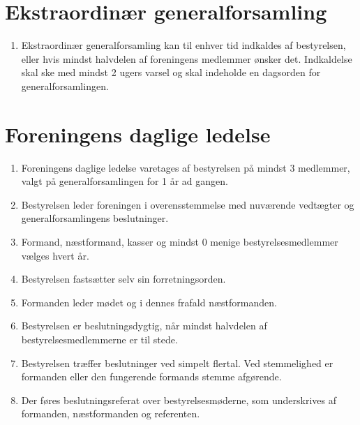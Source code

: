 \documentclass[a4paper, 10pt]{article}
\renewcommand\thesection{\textsection\arabic{section}}
\newenvironment{stykenum}{
  \begin{enumerate}[%
    label=Stk.~\arabic*:, ref=\thesection~Stk.~\arabic{enumi}, start=1]
}{\end{enumerate}}
\begin{document}
\section{Ekstraordinær generalforsamling}
\begin{stykenum}
    \item Ekstraordinær generalforsamling kan til enhver tid indkaldes af
        bestyrelsen, eller hvis mindst halvdelen af foreningens medlemmer ønsker
        det. Indkaldelse skal ske med mindst 2 ugers varsel og skal indeholde en
        dagsorden for generalforsamlingen.
\end{stykenum}

\section{Foreningens daglige ledelse}
\begin{stykenum}
    \item Foreningens daglige ledelse varetages af bestyrelsen på mindst 3
        medlemmer, valgt på generalforsamlingen for 1 år ad gangen.

    \item Bestyrelsen leder foreningen i overensstemmelse med nuværende
        vedtægter og generalforsamlingens beslutninger.

    \item Formand, næstformand, kasser og mindst 0 menige bestyrelsesmedlemmer
        vælges hvert år.

    \item Bestyrelsen fastsætter selv sin forretningsorden.

    \item Formanden leder mødet og i dennes frafald næstformanden.

    \item Bestyrelsen er beslutningsdygtig, når mindst halvdelen af
        bestyrelsesmedlemmerne er til stede.

    \item Bestyrelsen træffer beslutninger ved simpelt flertal. Ved stemmelighed
        er formanden eller den fungerende formands stemme afgørende.

    \item Der føres beslutningsreferat over bestyrelsesmøderne, som underskrives
        af formanden, næstformanden og referenten.
\end{stykenum}
\end{document}
